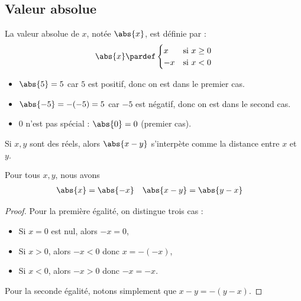 \subsection{Valeur absolue}
\begin{frame}
  La valeur absolue de \(x\), notée \(\abs{x}\), est définie par :
  \begin{equation*}
    \abs{x} \pardef \begin{cases}
      x &\textrm{si } x \geq 0\\
      -x & \textrm{si } x < 0 
    \end{cases}
  \end{equation*}

  \begin{example}
    \begin{itemize}
    \item \(\abs{5} = 5\) car \(5\) est positif, donc on est dans le premier cas.
    \item \(\abs{-5} = -(-5) = 5\) car \(-5\) est négatif, donc on est dans le second cas.
    \item \(0\) n'est pas spécial : \(\abs{0}= 0\) (premier cas).
    \end{itemize}
  \end{example}\pause
  \begin{remark}
    Si \(x,y\) sont des réels, alors \(\abs{x-y}\) s'interpète comme la distance entre \(x\) et \(y\).
  \end{remark}
\end{frame}

\begin{frame}%
  \begin{proposition}
    Pour tous \(x,y\), nous avons
    \begin{align*}
      \abs{x} &= \abs{-x} &  \abs{x-y} &= \abs{y-x} 
    \end{align*}
  \end{proposition}
\begin{proof}
  Pour la première égalité, on distingue trois cas :
  \begin{itemize}
  \item Si \(x=0\) est nul, alors \(-x = 0\),
  \item Si \(x>0\), alors \(-x < 0\) donc \(x = -(-x)\),
  \item Si \(x<0\), alors \(-x > 0\) donc \(-x = -x\).
  \end{itemize}
  Pour la seconde égalité, notons simplement que \(x-y = -(y-x)\).
\end{proof}
\end{frame}

